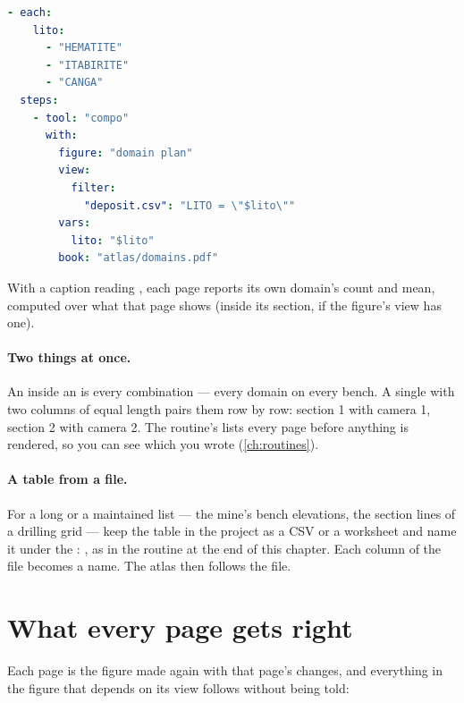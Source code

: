 \begin{lstlisting}[language=yaml]
- each:
    lito:
      - "HEMATITE"
      - "ITABIRITE"
      - "CANGA"
  steps:
    - tool: "compo"
      with:
        figure: "domain plan"
        view:
          filter:
            "deposit.csv": "LITO = \"$lito\""
        vars:
          lito: "$lito"
        book: "atlas/domains.pdf"
\end{lstlisting}

With a caption reading , each page reports its own domain's count and mean, computed over what that page shows (inside its section, if the figure's view has one).

\paragraph{Two things at once.} An  inside an  is every combination — every domain on every bench. A single  with two columns of equal length pairs them row by row: section 1 with camera 1, section 2 with camera 2. The routine's  lists every page before anything is rendered, so you can see which you wrote (\cref{ch:routines}).

\paragraph{A table from a file.} For a long or a maintained list — the mine's bench elevations, the section lines of a drilling grid — keep the table in the project as a CSV or a worksheet and name it under the : , as in the routine at the end of this chapter. Each column of the file becomes a \code{\$}name. The atlas then follows the file.

\section{What every page gets right}\label{sec:atlas-page}

Each page is the figure made again with that page's changes, and everything in the figure that depends on its view follows without being told:

